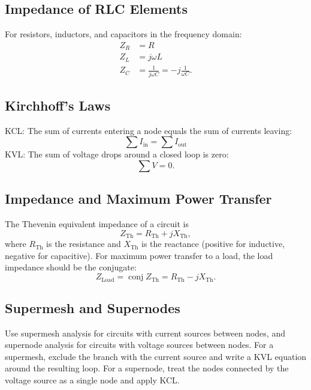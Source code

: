\documentclass[letterpaper]{scrartcl}
\DeclareMathOperator{\conj}{conj}
\newcommand{\thev}[0]{\mathrm{Th}}
\newcommand{\load}[0]{\mathrm{Load}}
\begin{document}
\subsection*{Impedance of RLC Elements}
For resistors, inductors, and capacitors in the frequency domain:
\begin{equation}\label{eqn:karlCircuitsCheatSheet:460}
\begin{aligned}
Z_R &= R \\
Z_L &= j \omega L \\
Z_C &= \frac{1}{j \omega C} = -j \frac{1}{\omega C}.
\end{aligned}
\end{equation}

\subsection*{Kirchhoff's Laws}
KCL: The sum of currents entering a node equals the sum of currents leaving:
\begin{equation}\label{eqn:karlCircuitsCheatSheet:480}
\sum I_{\text{in}} = \sum I_{\text{out}}
\end{equation}
KVL: The sum of voltage drops around a closed loop is zero:
\begin{equation}\label{eqn:karlCircuitsCheatSheet:500}
\sum V = 0.
\end{equation}

\subsection*{Impedance and Maximum Power Transfer}
The Thevenin equivalent impedance of a circuit is
\begin{equation}\label{eqn:karlCircuitsCheatSheet:340}
Z_\thev = R_\thev + j X_\thev,
\end{equation}
where \( R_\thev \) is the resistance and \( X_\thev \) is the reactance (positive for inductive, negative for capacitive). For maximum power transfer to a load, the load impedance should be the conjugate:
\begin{equation}\label{eqn:karlCircuitsCheatSheet:360}
Z_\load = \conj{Z_\thev} = R_\thev - j X_\thev.
\end{equation}

\subsection*{Supermesh and Supernodes}
Use supermesh analysis for circuits with current sources between nodes, and supernode analysis for circuits with voltage sources between nodes. For a supermesh, exclude the branch with the current source and write a KVL equation around the resulting loop. For a supernode, treat the nodes connected by the voltage source as a single node and apply KCL.
\end{document}
